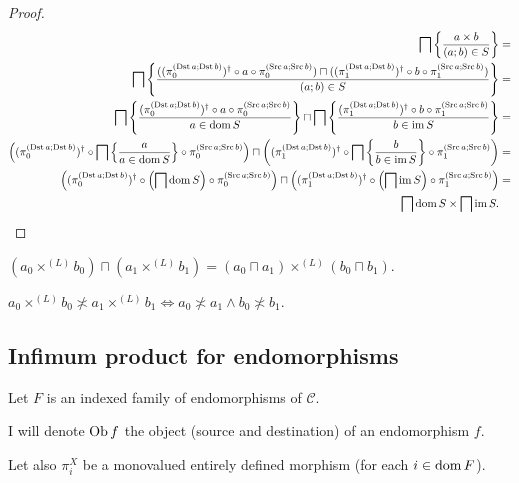 \begin{proof}
  ~
  \begin{align*}
  \bigsqcap \left\{ \frac{ a \times b }{ (a ; b) \in S }\right\} & = \\
  \bigsqcap \left\{ \frac{ ((\pi^{(\operatorname{Dst} a ; \operatorname{Dst}
  b)}_0)^{\dagger} \circ a \circ \pi^{(\operatorname{Src} a ; \operatorname{Src} b)}_0) \sqcap
  ((\pi^{(\operatorname{Dst} a ; \operatorname{Dst} b)}_1)^{\dagger} \circ b \circ
  \pi^{(\operatorname{Src} a ; \operatorname{Src} b)}_1) }{ (a ; b) \in S }\right\} & = \\
  \bigsqcap \left\{ \frac{ (\pi^{(\operatorname{Dst} a ; \operatorname{Dst}
  b)}_0)^{\dagger} \circ a \circ \pi^{(\operatorname{Src} a ; \operatorname{Src} b)}_0
  }{ a \in \operatorname{dom} S }\right\} \sqcap
  \bigsqcap
  \left\{ \frac{ (\pi^{(\operatorname{Dst} a ; \operatorname{Dst} b)}_1)^{\dagger} \circ b \circ
  \pi^{(\operatorname{Src} a ; \operatorname{Src} b)}_1 }{ b \in \operatorname{im} S }\right\} & = \\
  \left( (\pi^{(\operatorname{Dst} a ; \operatorname{Dst}
  b)}_0)^{\dagger} \circ \bigsqcap \left\{ \frac{ a }{ a \in
  \operatorname{dom} S }\right\} \circ \pi^{(\operatorname{Src} a ; \operatorname{Src} b)}_0 \right)
  \sqcap \left( (\pi^{(\operatorname{Dst} a ; \operatorname{Dst} b)}_1)^{\dagger} \circ
  \bigsqcap \left\{ \frac{ b }{ b \in \operatorname{im} S }\right\}
  \circ \pi^{(\operatorname{Src} a ; \operatorname{Src} b)}_1 \right) & = \\
  \left(
  (\pi^{(\operatorname{Dst} a ; \operatorname{Dst} b)}_0)^{\dagger} \circ \left( \bigsqcap
  \operatorname{dom} S \right) \circ \pi^{(\operatorname{Src} a ; \operatorname{Src} b)}_0 \right)
  \sqcap \left( (\pi^{(\operatorname{Dst} a ; \operatorname{Dst} b)}_1)^{\dagger} \circ \left(
  \bigsqcap \operatorname{im} S \right) \circ \pi^{(\operatorname{Src} a ; \operatorname{Src} b)}_1
  \right) & = \\
  \bigsqcap \operatorname{dom} S \times \bigsqcap \operatorname{im} S.
  \end{align*}
\end{proof}

\begin{cor}
  $(a_0 \times^{(L)} b_0) \sqcap (a_1 \times^{(L)} b_1) = (a_0 \sqcap a_1)
  \times^{(L)} (b_0 \sqcap b_1)$.
\end{cor}

\begin{cor}
  $a_0 \times^{(L)} b_0 \nasymp a_1 \times^{(L)} b_1 \Leftrightarrow a_0
  \nasymp a_1 \wedge b_0 \nasymp b_1$.
\end{cor}

\subsection{Infimum product for endomorphisms}

Let $F$ is an indexed family of endomorphisms of $\mathcal{C}$.

I will denote $\operatorname{Ob} f$ the object (source and destination) of an
endomorphism $f$.

Let also $\pi^X_i$ be a monovalued entirely defined morphism (for each $i \in
\operatorname{dom} F$).

